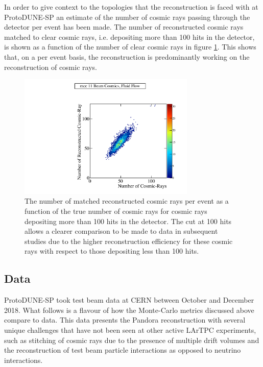 In order to give context to the topologies that the reconstruction is faced with at ProtoDUNE-SP an estimate of the number of cosmic rays passing through the detector per event has been made.  The number of reconstructed cosmic rays matched to clear cosmic rays, i.e. depositing more than 100 hits in the detector, is shown as a function of the number of clear cosmic rays in figure \ref{fig:crnperevt}.  This shows that, on a per event basis, the reconstruction is predominantly working on the reconstruction of cosmic rays.

\begin{figure}
\centering
\includegraphics[width=0.75\textwidth]{Figures/Metrics/MC/Cosmics/CRMatchesCosmicRayEvent.pdf}
\caption{The number of matched reconstructed cosmic rays per event as a function of the true number of cosmic rays for cosmic rays depositing more than 100 hits in the detector.  The cut at 100 hits allows a clearer comparison to be made to data in subsequent studies due to the higher reconstruction efficiency for these cosmic rays with respect to those depositing less than 100 hits.}
\label{fig:crnperevt}
\end{figure}

\subsection{Data}

ProtoDUNE-SP took test beam data at CERN between October and December 2018.  What follows is a flavour of how the Monte-Carlo metrics discussed above compare to data.  This data presents the Pandora reconstruction with several unique challenges that have not been seen at other active LArTPC experiments, such as stitching of cosmic rays due to the presence of multiple drift volumes and the reconstruction of test beam particle interactions as opposed to neutrino interactions.  

